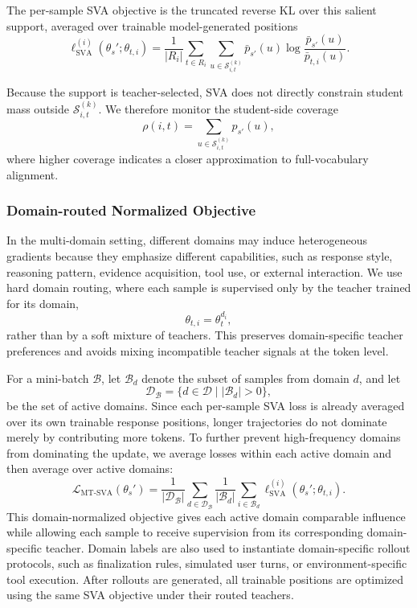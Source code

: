 \documentclass{llmxive}
\begin{document}
The per-sample SVA objective is the truncated reverse KL over this salient support, averaged over trainable model-generated positions
\begin{equation}
\ell_{\mathrm{SVA}}^{(i)}(\theta_s';\theta_{t,i})
=
\frac{1}{|R_i|}
\sum_{t\in R_i}
\sum_{u\in \mathcal{S}_{i,t}^{(k)}}
\bar p_{s'}(u)
\log
\frac{\bar p_{s'}(u)}{\bar p_{t,i}(u)} .
\end{equation}

Because the support is teacher-selected, SVA does not directly constrain student mass outside $\mathcal{S}_{i,t}^{(k)}$. We therefore monitor the student-side coverage
\begin{equation}
\rho(i,t)
=
\sum_{u\in \mathcal{S}_{i,t}^{(k)}} p_{s'}(u),
\end{equation}
where higher coverage indicates a closer approximation to full-vocabulary alignment.


\subsubsection{Domain-routed Normalized Objective}

In the multi-domain setting, different domains may induce heterogeneous gradients because they emphasize different capabilities, such as response style, reasoning pattern, evidence acquisition, tool use, or external interaction. We use hard domain routing, where each sample is supervised only by the teacher trained for its domain,
\[
\theta_{t,i} = \theta_t^{d_i},
\]
rather than by a soft mixture of teachers. This preserves domain-specific teacher preferences and avoids mixing incompatible teacher signals at the token level.

For a mini-batch $\mathcal{B}$, let $\mathcal{B}_d$ denote the subset of samples from domain $d$, and let
\[
\mathcal{D}_{\mathcal{B}}
=
\{d\in\mathcal{D}\mid |\mathcal{B}_d|>0\},
\]
be the set of active domains. Since each per-sample SVA loss is already averaged over its own trainable response positions, longer trajectories do not dominate merely by contributing more tokens. To further prevent high-frequency domains from dominating the update, we average losses within each active domain and then average over active domains:
\begin{equation}
\mathcal{L}_{\mathrm{MT\text{-}SVA}}(\theta_s')
=
\frac{1}{|\mathcal{D}_{\mathcal{B}}|}
\sum_{d\in \mathcal{D}_{\mathcal{B}}}
\frac{1}{|\mathcal{B}_d|}
\sum_{i\in \mathcal{B}_d}
\ell_{\mathrm{SVA}}^{(i)}(\theta_s';\theta_{t,i}).
\end{equation}
This domain-normalized objective gives each active domain comparable influence while allowing each sample to receive supervision from its corresponding domain-specific teacher. Domain labels are also used to instantiate domain-specific rollout protocols, such as finalization rules, simulated user turns, or environment-specific tool execution. After rollouts are generated, all trainable positions are optimized using the same SVA objective under their routed teachers.
\end{document}
